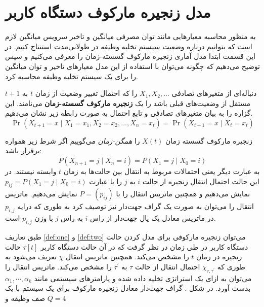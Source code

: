\section{مدل زنجیره مارکوف دستگاه کاربر}
به منظور محاسبه معیارهایی مانند توان مصرفی میانگین و تاخیر سرویس میانگین لازم است که بتوانیم درباره وضعیت سیستم تخلیه وظیفه در طولانی‌مدت استنتاج کنیم. در این قسمت ابتدا مدل آماری زنجیره مارکوف گسسته-زمان را معرفی می‌کنیم و سپس توضیح می‌دهیم که چگونه می‌توان با استفاده از این مدل معیارهای تاخیر و توان میانگین را برای یک سیستم تخلیه وظیفه محاسبه کرد.
\begin{defi}
\label{def:one}
دنباله‌ای از متغیرهای تصادفی $X_{1}, X_{2}, \ldots$ را که احتمال تغییر وضعیت از زمان $t$ به $t + 1$ مستقل از وضعیت‌های قبلی باشد را یک \textbf{زنجیره مارکوف گسسته-زمان} می‌نامند. این گزاره را به بیان متغیرهای تصادفی و تابع احتمال به صورت رابطه زیر نشان می‌دهیم.
\begin{equation*}
	\operatorname{Pr}\left(X_{t+1}=x \mid X_{1}=x_{1}, X_{2}=x_{2}, \ldots, X_{n}=x_{t}\right)=\operatorname{Pr}\left(X_{t+1}=x \mid X_{t}=x_{t}\right)
\end{equation*}
\end{defi}
\begin{defi}
\label{def:two}
زنجیره مارکوف گسسته زمان $X(t)$ را \textit{همگن-زمان} می‌گوییم اگر شرط زیر همواره برقرار باشد:
\begin{equation*}
P\left(X_{n+1}=j \mid X_{n}=i\right)=P\left(X_{1}=j \mid X_{0}=i\right)
\end{equation*}
به عبارت دیگر یعنی احتمالات مربوط به انتقال بین حالت‌ها به زمان \(t\) وابسته نیستند. در این حالت احتمال انتقال زنجیره از حالت \(i\) به \(j\) را با عبارت $p_{i j}=P\left(X_{1}=j \mid X_{0}=i\right)$ نمایش می‌دهیم و همچنین ماتریس انتقال را با $P=\left(p_{i j}\right)$ نمایش می‌دهیم. ماتریس انتقال را می‌توان به صورت یک گراف جهت‌دار نیز توصیف کرد به طوری که درایه $p_{i, j}$ در ماتریس معادل یک یال جهت‌دار از راس $i$ به راس $j$ با وزن $p_{i, j}$ است.
\end{defi}
طبق تعاریف \ref{def:one} و \ref{def:two} می‌توان زنجیره مارکوفی برای مدل کردن حالت دستگاه کاربر در طی زمان در نظر گرفت که در آن حالت دستگاه کاربر $\tau[t]$ حالت زنجیره در زمان $t$ را مشخص می‌کند. همچنین ماتریس انتقال $\chi$ تعریف می‌شود به طوری که $\chi_{\tau, \tau^{\prime}}$ احتمال انتقال از حالت $\tau$ به \(\tau^{\prime}\) را مشخص می‌کند.
\newpage
ماتریس انتقال را می‌توان به ازای یک استراتژی تخلیه داده شده و پارامترهای سیستمی مانند \(\alpha_1, \cdots, \alpha_k\) بدست آورد. در شکل . گراف جهت‌دار معادل زنجیره مارکوف برای یک سیستم با یک صف وظیفه و \(Q = 4\)
\clearpage